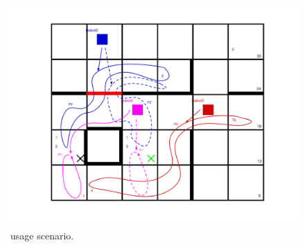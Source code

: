


\begin{figure}[t]
\begin{center}
\includegraphics[width=1\linewidth]{Figures/arrows.pdf}
\caption{\toolName\ usage scenario.}
\label{fig:outputexample}
\end{center}
\end{figure}


